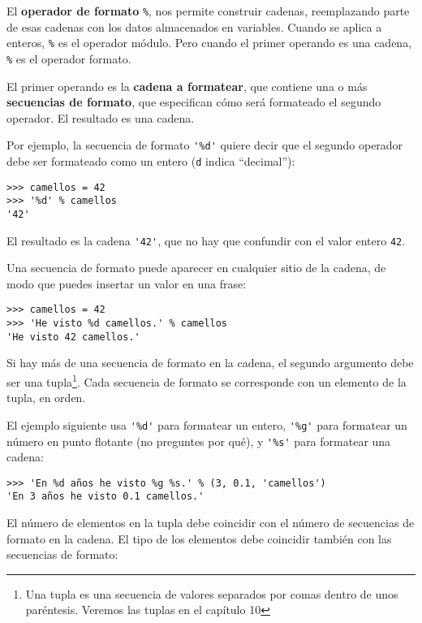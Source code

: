 
El {\bf operador de formato} {\tt \%},
nos permite construir cadenas, reemplazando parte de esas cadenas
con los datos almacenados en variables.
Cuando se aplica a enteros, {\tt \%} es el operador módulo. Pero
cuando el primer operando es una cadena, {\tt \%} es el operador formato.


El primer operando es la {\bf cadena a formatear}, que contiene
una o más {\bf secuencias de formato}, que especifican cómo
será formateado el segundo operador. El resultado es una cadena.


Por ejemplo, la secuencia de formato \verb"'%d'" quiere decir
que el segundo operador debe ser formateado como un
entero ({\tt d} indica ``decimal''):

\beforeverb
\begin{verbatim}
>>> camellos = 42
>>> '%d' % camellos
'42'
\end{verbatim}
\afterverb
%
El resultado es la cadena \verb"'42'", que no hay que confundir
con el valor entero {\tt 42}.

Una secuencia de formato puede aparecer en cualquier sitio de la cadena,
de modo que puedes insertar un valor en una frase:

\beforeverb
\begin{verbatim}
>>> camellos = 42
>>> 'He visto %d camellos.' % camellos
'He visto 42 camellos.'
\end{verbatim}
\afterverb
%
Si hay más de una secuencia de formato en la cadena,
el segundo argumento debe ser una tupla\footnote{Una tupla es una
secuencia de valores separados por comas dentro de unos paréntesis.
Veremos las tuplas en el capítulo 10}. Cada secuencia de formato se
corresponde con un elemento de la tupla, en orden.

El ejemplo siguiente usa \verb"'%d'" para formatear un entero,
\verb"'%g'" para formatear
un número en punto flotante (no preguntes por qué), y \verb"'%s'" para
formatear una cadena:

\beforeverb
\begin{verbatim}
>>> 'En %d años he visto %g %s.' % (3, 0.1, 'camellos')
'En 3 años he visto 0.1 camellos.'
\end{verbatim}
\afterverb
%
El número de elementos en la tupla debe coincidir con el número
de secuencias de formato en la cadena. El tipo de los
elementos debe coincidir también con las secuencias de formato:

